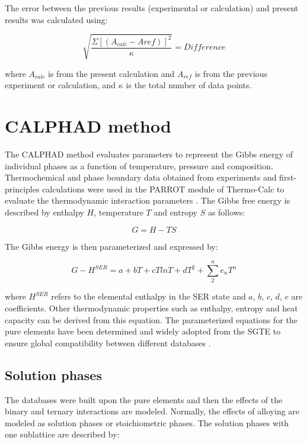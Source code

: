 The error between the previous results (experimental or calculation) and present results was calculated using:

\begin{equation}
\label{eq: error}
\sqrt{\frac{\Sigma[(A_{calc}-A{ref})]^{2}}{\kappa}} = Difference
\end{equation}

\noindent where $A_{calc}$ is from the present calculation and $A_{ref}$ is from the previous experiment or calculation, and $\kappa$ is the total number of data points. 

\section{CALPHAD method}

The CALPHAD method evaluates parameters to represent the Gibbs energy of individual phases as a function of temperature, pressure and composition. Thermochemical and phase boundary data obtained from experiments and first-principles calculations were used in the PARROT module of Thermo-Calc to evaluate the thermodynamic interaction parameters \cite{Andersson2002}. The Gibbs free energy is described by enthalpy $H$, temperature $T$ and entropy $S$ as follows:

\begin{equation}
\label{eq: gibbs}
G = H - T S 
\end{equation}

\noindent The Gibbs energy is then parameterized and expressed by:

\begin{equation}
\label{eq: parameterizaiton}
G - H^{SER} = a + bT + cT ln T + d T^2 + \sum_{2}^{n} e_{n} T^{n}
\end{equation}

\noindent where $H^{SER}$ refers to the elemental enthalpy in the SER state and $a$, $b$, $c$, $d$, $e$ are coefficients. Other thermodynamic properties such as enthalpy, entropy and heat capacity can be derived from this equation. The parameterized equations for the pure elements have been determined and widely adopted from the SGTE to ensure global compatibility between different databases \cite{Dinsdale1991}.

\subsection{Solution phases}

The databases were built upon the pure elements and then the effects of the binary and ternary interactions are modeled. Normally, the effects of alloying are modeled as solution phases or stoichiometric phases. The solution phases with one sublattice are described by: 

